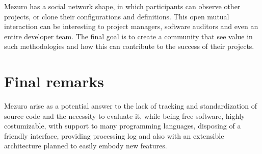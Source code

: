 \documentclass{llncs}
\begin{document}
Mezuro has a social network shape, in which participants can observe other
projects, or clone their configurations and definitions. This open mutual
interaction can be interesting to project managers, software
auditors and even an entire developer team. The final goal is to create a
community that see value in such methodologies and how this can contribute
to the success of their projects.

\section{Final remarks}

Mezuro arise as a potential answer to the lack of tracking and standardization
of source code and the necessity to evaluate it, while being free software,
highly costumizable, with support to many programming languages, disposing of
a friendly interface, providing processing log and also with an extensible
architecture planned to easily embody new features.




\end{document}
